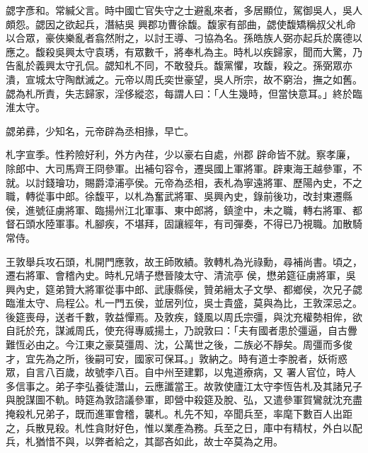 \begin{pinyinscope}
 勰字彥和。常緘父言。時中國亡官失守之士避亂來者，多居顯位，駕御吳人，吳人頗怨。勰因之欲起兵，潛結吳
 興郡功曹徐馥。馥家有部曲，勰使馥矯稱叔父札命以合眾，豪俠樂亂者翕然附之，以討王導、刁協為名。孫皓族人弼亦起兵於廣德以應之。馥殺吳興太守袁琇，有眾數千，將奉札為主。時札以疾歸家，聞而大驚，乃告亂於義興太守孔侃。勰知札不同，不敢發兵。馥黨懼，攻馥，殺之。孫弼眾亦潰，宣城太守陶猷滅之。元帝以周氏奕世豪望，吳人所宗，故不窮治，撫之如舊。勰為札所責，失志歸家，淫侈縱恣，每謂人曰：「人生幾時，但當快意耳。」終於臨淮太守。



 勰弟彞，少知名，元帝辟為丞相掾，早亡。



 札字宣季。性矜險好利，外方內荏，少以豪右自處，州郡
 辟命皆不就。察孝廉，除郎中、大司馬齊王冏參軍。出補句容令，遷吳國上軍將軍。辟東海王越參軍，不就。以討錢璯功，賜爵漳浦亭侯。元帝為丞相，表札為寧遠將軍、歷陽內史，不之職，轉從事中郎。徐馥平，以札為奮武將軍、吳興內史，錄前後功，改封東遷縣侯，進號征虜將軍、臨揚州江北軍事、東中郎將，鎮塗中，未之職，轉右將軍、都督石頭水陸軍事。札腳疾，不堪拜，固讓經年，有司彈奏，不得已乃視職。加散騎常侍。



 王敦舉兵攻石頭，札開門應敦，故王師敗績。敦轉札為光祿勳，尋補尚書。頃之，遷右將軍、會稽內史。時札兄靖子懋晉陵太守、清流亭
 侯，懋弟筵征虜將軍，吳興內史，筵弟贊大將軍從事中郎、武康縣侯，贊弟縉太子文學、都鄉侯，次兄子勰臨淮太守、烏程公。札一門五侯，並居列位，吳士貴盛，莫與為比，王敦深忌之。後筵喪母，送者千數，敦益憚焉。及敦疾，錢風以周氏宗彊，與沈充權勢相侔，欲自託於充，謀滅周氏，使充得專威揚土，乃說敦曰：「夫有國者患於彊逼，自古釁難恆必由之。今江東之豪莫彊周、沈，公萬世之後，二族必不靜矣。周彊而多俊才，宜先為之所，後嗣可安，國家可保耳。」敦納之。時有道士李脫者，妖術惑眾，自言八百歲，故號李八百。自中州至建鄴，以鬼道療病，又
 署人官位，時人多信事之。弟子李弘養徒灊山，云應讖當王。故敦使廬江太守李恆告札及其諸兄子與脫謀圖不軌。時筵為敦諮議參軍，即營中殺筵及脫、弘，又遣參軍賀鸞就沈充盡掩殺札兄弟子，既而進軍會稽，襲札。札先不知，卒聞兵至，率麾下數百人出距之，兵散見殺。札性貪財好色，惟以業產為務。兵至之日，庫中有精杖，外白以配兵，札猶惜不與，以弊者給之，其鄙吝如此，故士卒莫為之用。




\end{pinyinscope}
